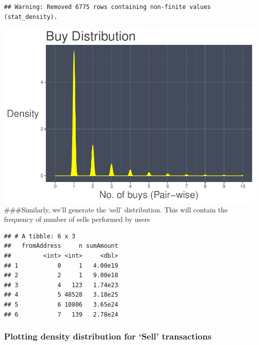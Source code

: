 \documentclass[]{article}
\newenvironment{Shaded}{\begin{snugshade}}{\end{snugshade}}
\newcommand{\KeywordTok}[1]{\textcolor[rgb]{0.13,0.29,0.53}{\textbf{#1}}}
\newcommand{\DataTypeTok}[1]{\textcolor[rgb]{0.13,0.29,0.53}{#1}}
\newcommand{\StringTok}[1]{\textcolor[rgb]{0.31,0.60,0.02}{#1}}
\newcommand{\OperatorTok}[1]{\textcolor[rgb]{0.81,0.36,0.00}{\textbf{#1}}}
\newcommand{\NormalTok}[1]{#1}
\begin{document}
\begin{verbatim}
## Warning: Removed 6775 rows containing non-finite values (stat_density).
\end{verbatim}

\includegraphics{analysis_files/figure-latex/unnamed-chunk-48-1.pdf}
\#\#\#Similarly, we'll generate the `sell' distribution. This will
contain the frequency of number of sells performed by users

\begin{Shaded}
\end{Shaded}

\begin{verbatim}
## # A tibble: 6 x 3
##   fromAddress     n sumAmount
##         <int> <int>     <dbl>
## 1           0     1   4.00e19
## 2           2     1   9.00e18
## 3           4   123   1.74e23
## 4           5 48528   3.18e25
## 5           6 10806   3.65e24
## 6           7   139   2.78e24
\end{verbatim}

\subsubsection{\texorpdfstring{Plotting density distribution for `Sell'
transactions}{Plotting density distribution for Sell transactions}}\label{plotting-density-distribution-for-sell-transactions-2}
\end{document}
